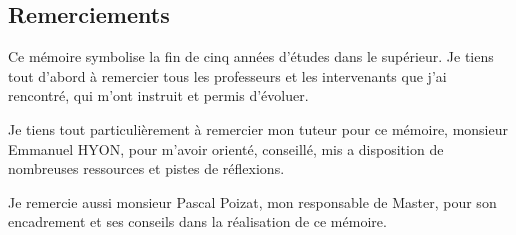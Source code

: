 \begin{center}
\subsection*{Remerciements}
\end{center}

\hskip7mm

\begin{spacing}{1.3}
Ce mémoire symbolise la fin de cinq années d'études dans le supérieur. Je tiens tout d'abord à remercier tous les professeurs et les intervenants que j'ai rencontré, qui m'ont instruit et permis d'évoluer.

\vspace{5mm}

Je tiens tout particulièrement à remercier mon tuteur pour ce mémoire, monsieur Emmanuel HYON, pour m'avoir orienté, conseillé, mis a disposition de nombreuses ressources et pistes de réflexions.

\vspace{5mm}

Je remercie aussi monsieur Pascal Poizat, mon responsable de Master, pour son encadrement et ses conseils dans la réalisation de ce mémoire.

\vspace{5mm}


\end{spacing}